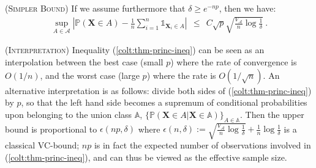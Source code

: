 \begin{remark} (\textsc{Simpler Bound})
If we assume furthermore that $\delta \ge e^{-np}$, then we have:
\begin{align*}
\sup_{A \in \mathcal{A}} \left | \mathbb{P}(\mathbf{X} \in A) - \frac{1}{n} \sum_{i=1}^n \mathds{1}_{\mathbf{X}_i \in A} \right| ~~\le~~ C \sqrt{p} \sqrt{\frac{V_{\mathcal{A}}}{n} \log{\frac{1}{\delta}}}~.
\end{align*}
\end{remark}

\begin{remark} (\textsc{Interpretation})
\label{colt:rk:interpretation}
Inequality (\ref{colt:thm-princ-ineq}) can be seen as an interpolation
between the best case (small $p$) where the rate of convergence is
$O(1/n)$,  %
and the worst case (large $p$) where the rate is $O(1/\sqrt{n})$.
An alternative interpretation is as follows: divide both sides of
(\ref{colt:thm-princ-ineq}) by $p$, so that the left hand side becomes  a
supremum of 
conditional probabilities   upon belonging to the union class
$\mathbb{A}$, $\{\mathbb{P}(\mathbf{X}\in A \big|\mathbf{X}\in \mathbb{A}) \}_{A\in\mathbb{A}}$. Then the upper bound is proportional to $\epsilon(np, \delta)$ where $\epsilon(n, \delta) :=\sqrt{\frac{V_{\mathcal{A}}}{n} \log{\frac{1}{\delta}}} + \frac{1}{n} \log{\frac{1}{\delta}}$ is a classical VC-bound; $np$ is in fact the expected number of observations involved in (\ref{colt:thm-princ-ineq}), and can thus be viewed as the effective sample size. %
\end{remark}


